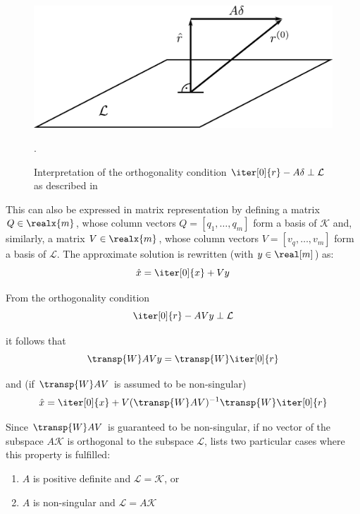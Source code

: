 \begin{figure}[h]
    \centering
    \includegraphics[width=0.7\linewidth]{chapters/2_solvers/2_3_iterative_solvers/figures/subspace.pdf}
    \caption{Interpretation of the orthogonality condition $\iter[0]{r} - A\delta \perp \mathcal{L}$ as described in \cite{saad_iterative_2003}}.
    \label{fig:subspace}
\end{figure}

\noindent This can also be expressed in matrix representation by defining a matrix $Q \in \realx{m}$, whose column vectors $Q =[q_1,\dots, q_m]$ form a basis of $\mathcal{K}$ and, similarly, a matrix $V \in \realx{m}$, whose column vectors $V = [v_q,\dots,v_m]$ form a basis of $\mathcal{L}$. The approximate solution is rewritten (with $y \in \real[m]$) as:
\begin{equation}
    \hat{x} = \iter[0]{x}+Vy
\end{equation}

\noindent From the orthogonality condition
\begin{equation}
    \iter[0]{r} -AVy \perp \mathcal{L}
\end{equation}

\noindent it follows that
\begin{equation}
    \transp{W}AVy = \transp{W}\iter[0]{r}
\end{equation}

\noindent and (if $\transp{W}AV$ is assumed to be non-singular)
\begin{equation}
    \hat{x} = \iter[0]{x}+V(\transp{W}AV)^{-1}\transp{W}\iter[0]{r}
\end{equation}

\noindent Since $\transp{W}AV$ is guaranteed to be non-singular, if no vector of the subspace $A\mathcal{K}$ is orthogonal to the subspace $\mathcal{L}$, \cite{saad_iterative_2003} lists two particular cases where this property is fulfilled:
\begin{enumerate}
    \item $A$ is positive definite and $\mathcal{L}=\mathcal{K}$, or
    \item $A$ is non-singular and $\mathcal{L}=A\mathcal{K}$
\end{enumerate}

